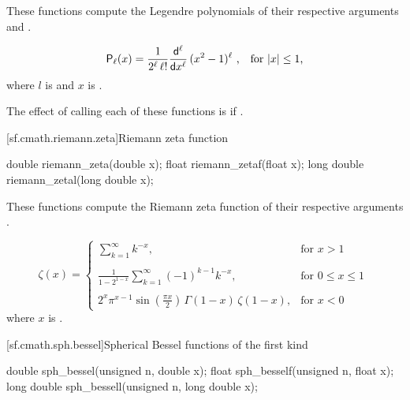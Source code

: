 \begin{itemdescr}
\pnum
\effects
These functions compute the Legendre polynomials of their
respective arguments
 and .

\pnum
\returns
\[ \mathsf{P}_\ell(x) =
     \frac{1}{2^\ell \, \ell!}
     \frac{\mathsf{d}^\ell}{\mathsf{d}x^\ell} \, (x^2 - 1) ^ \ell
     \text{ ,\quad for $|x| \le 1$,} \]
where
$l$ is  and
$x$ is .

\pnum
\remarks
The effect of calling each of these functions
is 
if .
\end{itemdescr}

[sf.cmath.riemann.zeta]{Riemann zeta function}%
%
%
%
%
\begin{itemdecl}
double       riemann_zeta(double x);
float        riemann_zetaf(float x);
long double  riemann_zetal(long double x);
\end{itemdecl}

\begin{itemdescr}

\pnum\effects
These functions compute the Riemann zeta function
of their respective arguments
.

\pnum\returns
\[%
  \mathsf{\zeta}(x) =
  \left\{
  \begin{array}{cl}
  \displaystyle
  \sum_{k=1}^\infty k^{-x},
  & \mbox{for $x > 1$}
  \\
  \\
  \displaystyle
  \frac{1}
	{1 - 2^{1-x}}
  \sum_{k=1}^\infty (-1)^{k-1} k^{-x},
  & \mbox{for $0 \le x \le 1$}
  \\
  \\
  \displaystyle
  2^x \pi^{x-1} \sin(\frac{\pi x}{2}) \, \Gamma(1-x) \, \zeta(1-x),
  & \mbox{for $x < 0$}
  \end{array}
  \right.
\;
\]
where
$x$ is .
\end{itemdescr}

[sf.cmath.sph.bessel]{Spherical Bessel functions of the first kind}%
%
%
%
%
%
\begin{itemdecl}
double       sph_bessel(unsigned n, double x);
float        sph_besself(unsigned n, float x);
long double  sph_bessell(unsigned n, long double x);
\end{itemdecl}

